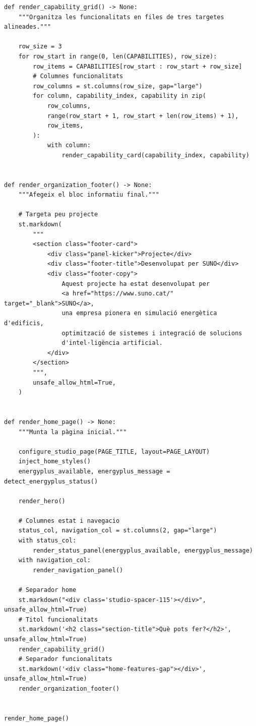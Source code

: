 \documentclass[10pt,a4paper]{article}
\begin{document}
\begin{lstlisting}[style=studioPython,caption={Inici.py},label={lst:inici-py}]
def render_capability_grid() -> None:
    """Organitza les funcionalitats en files de tres targetes alineades."""

    row_size = 3
    for row_start in range(0, len(CAPABILITIES), row_size):
        row_items = CAPABILITIES[row_start : row_start + row_size]
        # Columnes funcionalitats
        row_columns = st.columns(row_size, gap="large")
        for column, capability_index, capability in zip(
            row_columns,
            range(row_start + 1, row_start + len(row_items) + 1),
            row_items,
        ):
            with column:
                render_capability_card(capability_index, capability)


def render_organization_footer() -> None:
    """Afegeix el bloc informatiu final."""

    # Targeta peu projecte
    st.markdown(
        """
        <section class="footer-card">
            <div class="panel-kicker">Projecte</div>
            <div class="footer-title">Desenvolupat per SUNO</div>
            <div class="footer-copy">
                Aquest projecte ha estat desenvolupat per
                <a href="https://www.suno.cat/" target="_blank">SUNO</a>,
                una empresa pionera en simulació energètica d'edificis,
                optimització de sistemes i integració de solucions
                d'intel·ligència artificial.
            </div>
        </section>
        """,
        unsafe_allow_html=True,
    )


def render_home_page() -> None:
    """Munta la pàgina inicial."""

    configure_studio_page(PAGE_TITLE, layout=PAGE_LAYOUT)
    inject_home_styles()
    energyplus_available, energyplus_message = detect_energyplus_status()

    render_hero()

    # Columnes estat i navegacio
    status_col, navigation_col = st.columns(2, gap="large")
    with status_col:
        render_status_panel(energyplus_available, energyplus_message)
    with navigation_col:
        render_navigation_panel()

    # Separador home
    st.markdown("<div class='studio-spacer-115'></div>", unsafe_allow_html=True)
    # Titol funcionalitats
    st.markdown('<h2 class="section-title">Què pots fer?</h2>', unsafe_allow_html=True)
    render_capability_grid()
    # Separador funcionalitats
    st.markdown('<div class="home-features-gap"></div>', unsafe_allow_html=True)
    render_organization_footer()


render_home_page()
\end{lstlisting}
\end{document}
